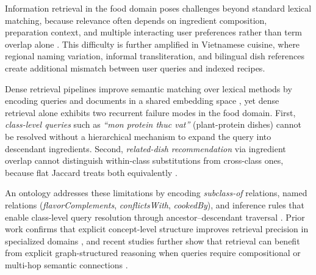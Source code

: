 \label{sec:introduction}

Information retrieval in the food domain poses challenges beyond standard lexical matching, because relevance often depends on ingredient composition, preparation context, and multiple interacting user preferences rather than term overlap alone \cite{robertson2009probabilistic, karpukhin2020dense, zhang2023recipempr, hu2024bridging}. This difficulty is further amplified in Vietnamese cuisine, where regional naming variation, informal transliteration, and bilingual dish references create additional mismatch between user queries and indexed recipes.

Dense retrieval pipelines improve semantic matching over lexical methods by encoding queries and documents in a shared embedding space \cite{karpukhin2020dense, thakur2021beir}, yet dense retrieval alone exhibits two recurrent failure modes in the food domain. First, \emph{class-level queries} such as \textit{``mon protein thuc vat''} (plant-protein dishes) cannot be resolved without a hierarchical mechanism to expand the query into descendant ingredients. Second, \emph{related-dish recommendation} via ingredient overlap cannot distinguish within-class substitutions from cross-class ones, because flat Jaccard treats both equivalently \cite{park2021flavorgraph}.


An ontology addresses these limitations by encoding \emph{subclass-of} relations, named relations (\emph{flavorComplements}, \emph{conflictsWith}, \emph{cookedBy}), and inference rules that enable class-level query resolution through ancestor--descendant traversal \cite{gruber1993translation, dooley2018foodon}. Prior work confirms that explicit concept-level structure improves retrieval precision in specialized domains \cite{vallet2005ontology, fernandez2011semantic, castells2007adaptation}, and recent studies further show that retrieval can benefit from explicit graph-structured reasoning when queries require compositional or multi-hop semantic connections \cite{he2024g, hipporag2024, kg2rag2025}.


